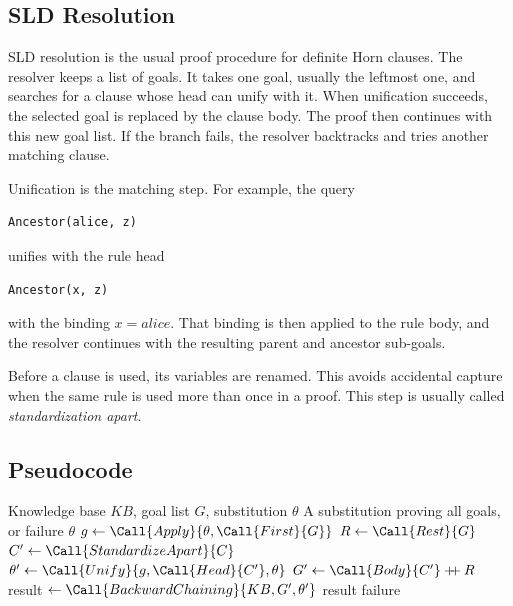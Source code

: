 \subsection{SLD Resolution}

SLD resolution is the usual proof procedure for definite Horn clauses.
The resolver keeps a list of goals.
It takes one goal, usually the leftmost one, and searches for a clause whose
head can unify with it.
When unification succeeds, the selected goal is replaced by the clause body.
The proof then continues with this new goal list.
If the branch fails, the resolver backtracks and tries another matching
clause.

Unification is the matching step.
For example, the query

\begin{verbatim}
Ancestor(alice, z)
\end{verbatim}

unifies with the rule head

\begin{verbatim}
Ancestor(x, z)
\end{verbatim}

with the binding $x = alice$.
That binding is then applied to the rule body, and the resolver continues with
the resulting parent and ancestor sub-goals.

Before a clause is used, its variables are renamed.
This avoids accidental capture when the same rule is used more than once in a
proof.
This step is usually called \emph{standardization apart}.

\subsection{Pseudocode}

\begin{algorithm}[h]
\caption{Backward chaining over Horn clauses}
\label{alg:backward_chaining}
\begin{algorithmic}[1]
\Require Knowledge base $KB$, goal list $G$, substitution $\theta$
\Ensure A substitution proving all goals, or failure
    \State \Return $\theta$
  \EndIf
  \State $g \gets \Call{Apply}{\theta, \Call{First}{G}}$
  \State $R \gets \Call{Rest}{G}$
    \State $C' \gets \Call{StandardizeApart}{C}$
    \State $\theta' \gets \Call{Unify}{g, \Call{Head}{C'}, \theta}$
      \State $G' \gets \Call{Body}{C'} \mathbin{+\!\!+} R$
      \State result $\gets \Call{BackwardChaining}{KB, G', \theta'}$
        \State \Return result
      \EndIf
    \EndIf
  \EndFor
  \State \Return failure
\EndProcedure
\end{algorithmic}
\end{algorithm}

